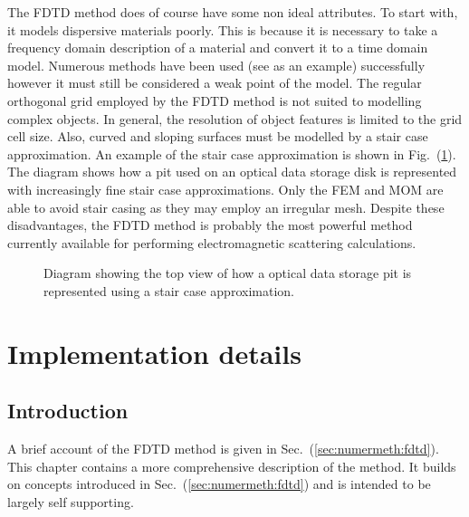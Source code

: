 \documentclass[a4paper, 12pt]{article}
\newcommand{\rfig}[1]{Fig.\ (\ref{#1})}
\newcommand{\sect}[1]{Sec.\ (\ref{#1})}
\begin{document}
	The FDTD method does of course have some non ideal attributes. To
	start with, it models dispersive materials poorly. This is because it is necessary to take a frequency domain
	description of a material and convert it to a time domain
	model. Numerous methods have been used (see
	\cite{luebbers90ieeetranseleccomp222} as an example) successfully
	however it must still be considered a weak point of the model. The
	regular orthogonal grid employed by the FDTD method is not suited to
	modelling complex objects. In general, the resolution of object
	features is limited to the grid cell size. Also, curved and sloping
	surfaces must be modelled by a stair case approximation. An example of
	the stair case approximation is shown in
	\rfig{fig:numermeth:staircase}. The diagram shows how a pit used on an
	optical data storage disk is represented with increasingly fine stair
	case approximations. Only the FEM and MOM are able to avoid stair
	casing as they may employ an irregular mesh. Despite these
	disadvantages, the FDTD method is probably the most powerful method
	currently available for performing electromagnetic scattering calculations.
	\begin{figure}[!h]
		\centering
		\caption{Diagram showing the top view of how a optical data storage
			pit is represented using a stair case approximation.}
		\label{fig:numermeth:staircase}
	\end{figure}
	\section{Implementation details}
	\subsection{Introduction}
	A brief account of the FDTD method is given in
	\sect{sec:numermeth:fdtd}. This chapter contains a more
	comprehensive description of the method. It builds on concepts
	introduced in \sect{sec:numermeth:fdtd} and is intended to be
	largely self supporting.
\end{document}
